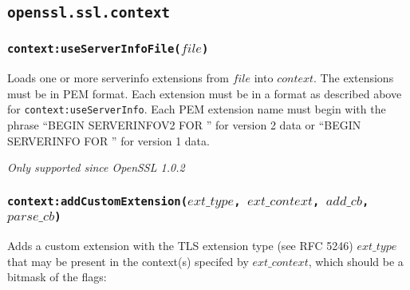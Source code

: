 \documentclass[11pt, oneside]{memoir}
\newcommand*{\fn}[1]{\texttt{#1}\xspace}
\newcounter{toccols}
\newenvironment{Module}[1]{
	\subsection{\texttt{#1}}
	\addtocontents{toc}{
		\protect\begin{multicols}{\value{toccols}}
	}
}{
	\addtocontents{toc}{\protect\end{multicols}}
}
\begin{document}
\begin{Module}{openssl.ssl.context}
\subsubsection[\fn{context:useServerInfoFile}]{\fn{context:useServerInfoFile($file$)}}

Loads one or more serverinfo extensions from $file$ into $context$. The extensions must be in PEM format. Each extension must be in a format as described above for \fn{context:useServerInfo}. Each PEM extension name must begin with the phrase ``BEGIN SERVERINFOV2 FOR '' for version 2 data or ``BEGIN SERVERINFO FOR '' for version 1 data.

\emph{Only supported since OpenSSL 1.0.2}

\subsubsection[\fn{context:addCustomExtension}]{\fn{context:addCustomExtension($ext\_type$, $ext\_context$, $add\_cb$, $parse\_cb$)}}

Adds a custom extension with the TLS extension type (see RFC 5246) $ext\_type$ that may be present in the context(s) specifed by $ext\_context$, which should be a bitmask of the flags:


\end{Module}
\end{document}
